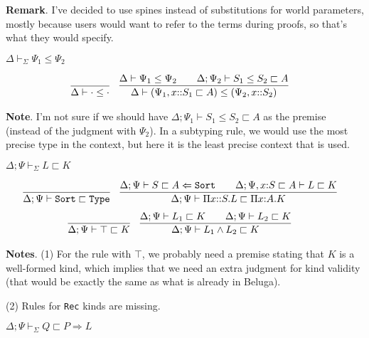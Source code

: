 \documentclass[letterpaper, 11pt]{article}
\newcommand{\Rar}{\Rightarrow}
\newcommand{\Lar}{\Leftarrow}
\newcommand{\Type}{\texttt{Type}}
\newcommand{\Sort}{\texttt{Sort}}
\begin{document}
    \textbf{Remark}.  I've decided to use spines instead of substitutions for world parameters, mostly because users would want to refer to
    the terms during proofs, so that's what they would specify.

    $\boxed{\Delta \vdash_\Sigma \Psi_1 \leq \Psi_2}$

    \begin{align*}
      & \infer{\Delta \vdash \cdot \leq \cdot}{} &
      & \infer{\Delta \vdash (\Psi_1, x{::}S_1 \sqsubset A) \leq (\Psi_2, x{::}S_2)}
              {
                \Delta \vdash  \Psi_1 \leq \Psi_2
                &&
                \Delta; \Psi_2 \vdash S_1 \leq S_2 \sqsubset A
              }
    \end{align*}

    \textbf{Note}.  I'm not sure if we should have $\Delta; \Psi_1 \vdash S_1 \leq S_2 \sqsubset A$ as the premise (instead of the judgment with $\Psi_2$).
    In a subtyping rule, we would use the most precise type in the context, but here it is the least precise context that is used.

    $\boxed{ \Delta; \Psi \vdash_\Sigma L \sqsubset K}$
    
    \begin{align*}
      & \infer{\Delta ; \Psi \vdash \Sort \sqsubset \Type}{} &
      & \infer{\Delta ; \Psi \vdash \Pi x{::}S.L \sqsubset \Pi x{:}A.K}
        {
          \Delta ; \Psi \vdash S \sqsubset A \Lar \Sort
          &&
          \Delta ; \Psi, x {:} S \sqsubset A \vdash L \sqsubset K
        }
    \end{align*}
    \begin{align*}
      & \infer{\Delta ; \Psi \vdash \top \sqsubset K}{} &
      & \infer{\Delta ; \Psi \vdash L_1 \land L_2 \sqsubset K}
        {
          \Delta ; \Psi  \vdash L_1 \sqsubset K
          &&
          \Delta ; \Psi  \vdash L_2 \sqsubset K
        }
    \end{align*}

    \textbf{Notes}. (1) For the rule with $\top$, we probably need a premise stating that $K$ is a well-formed kind, which implies that we need an extra
    judgment for kind validity (that would be exactly the same as what is already in Beluga).

    (2) Rules for \texttt{Rec} kinds are missing.

    $\boxed{ \Delta; \Psi \vdash_\Sigma Q \sqsubset P \Rar L}$
\end{document}
